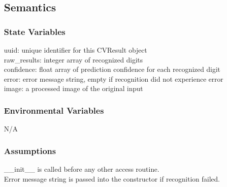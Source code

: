 \documentclass[11pt]{article}
\begin{document}
		\subsection{Semantics}
		\subsubsection{State Variables}
		uuid: unique identifier for this CVResult object \\
		raw\_results: integer array of recognized digits \\
		confidence: float array of prediction confidence for each recognized digit \\
		error: error message string, empty if recognition did not experience error \\
		image: a processed image of the original input
		
		
		\subsubsection{Environmental Variables}
		N/A
		
		\subsubsection{Assumptions}
		\_\_init\_\_ is called before any other access routine. \\
		Error message string is passed into the constructor if recognition failed.
		
\end{document}
